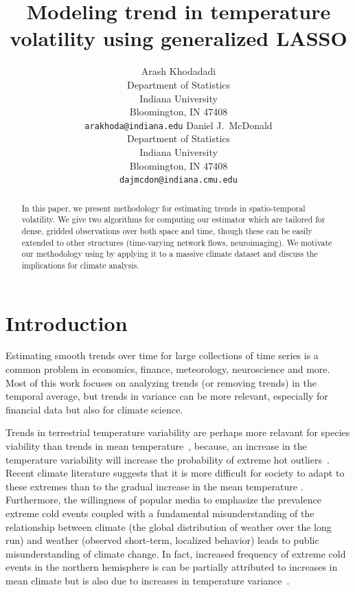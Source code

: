 \documentclass{article}
\title{Modeling trend in temperature volatility using generalized LASSO}
\author{Arash Khodadadi\\
 Department of Statistics\\
 Indiana University\\
 Bloomington, IN 47408 \\
 \texttt{arakhoda@indiana.edu}
\And
  Daniel J.\ McDonald \\
 Department of Statistics\\
 Indiana University\\
 Bloomington, IN 47408 \\
 \texttt{dajmcdon@indiana.cmu.edu}}
\begin{document}
 


\maketitle


\begin{abstract}
In this paper, we present methodology for estimating trends in
spatio-temporal volatility. We give two algorithms for computing our
estimator which are tailored for dense, gridded observations over both
space and time, though these can be easily extended to other
structures (time-varying network flows, neuroimaging). We motivate our
methodology using by applying it to a massive climate dataset and
discuss the implications for climate analysis.
\end{abstract}



\section{Introduction}

Estimating smooth trends over time for large collections of time
series is a common problem in economics, finance, meteorology,
neuroscience and more. Most of this work focuses on analyzing trends
(or removing trends) in the temporal average, but trends in variance
can be more relevant, especially for financial data but also for
climate science.

Trends in terrestrial temperature variability are perhaps more relavant for species
viability than trends in mean
temperature~\citep{huntingford_no_2013},
because, an increase in the
temperature variability will increase the probability of extreme hot
outliers~\citep{VasseurDeLong2014}. Recent climate literature
suggests that it is more difficult for society to adapt to these
extremes than to the gradual increase in the mean temperature
\citep{hansen_perception_2012,huntingford_no_2013}. Furthermore, the willingness of popular media to
emphasize the prevalence extreme cold events coupled with a
fundamental misunderstanding of the relationship between climate (the global
distribution of weather over the long run) and weather (observed
short-term, localized behavior) leads to public misunderstanding of climate
change. In fact, increased frequency of extreme cold events in the
northern hemisphere is can be partially attributed to increases in
mean climate but is also due to increases in temperature
variance~\citep{Screen2014,FischerBeyerle2013,TrenberthZhang2014}. 
\end{document}
